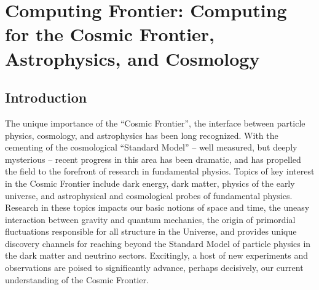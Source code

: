  
\chapter{Computing Frontier: Computing for the Cosmic Frontier, Astrophysics, and Cosmology}
\label{chap:mag}


\begin{center}\begin{boldmath}



\end{boldmath}\end{center}


\section{Introduction}
\label{sec:comp-intro}

The unique importance of the ``Cosmic Frontier'', the interface
between particle physics, cosmology, and astrophysics has been long
recognized. With the cementing of the cosmological ``Standard Model''
-- well measured, but deeply mysterious -- recent progress in this
area has been dramatic, and has propelled the field to the forefront
of research in fundamental physics. Topics of key interest in the
Cosmic Frontier include dark energy, dark matter, physics of the early
universe, and astrophysical and cosmological probes of fundamental
physics. Research in these topics impacts our basic notions of space
and time, the uneasy interaction between gravity and quantum
mechanics, the origin of primordial fluctuations responsible for all
structure in the Universe, and provides unique discovery channels for
reaching beyond the Standard Model of particle physics in the dark
matter and neutrino sectors. Excitingly, a host of new experiments and
observations are poised to significantly advance, perhaps decisively,
our current understanding of the Cosmic Frontier.

